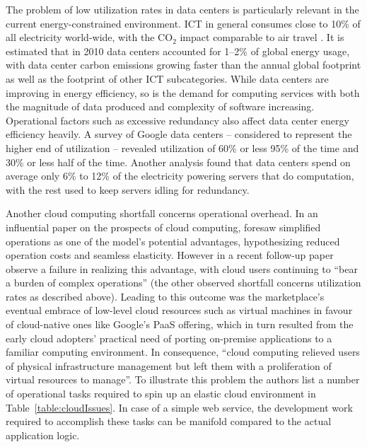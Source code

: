 The problem of low utilization rates in data centers is particularly relevant in the current energy-constrained environment. ICT in general consumes close to 10\% of all electricity world-wide, with the CO$_2$ impact comparable to air travel \parencite{buyya2017manifesto}. It is estimated that in 2010 data centers accounted for 1--2\% of global energy usage, with data center carbon emissions growing faster than the annual global footprint as well as the footprint of other ICT subcategories. While data centers are improving in energy efficiency, so is the demand for computing services with both the magnitude of data produced and complexity of software increasing. Operational factors such as excessive redundancy also affect data center energy efficiency heavily. A survey of Google data centers -- considered to represent the higher end of utilization -- revealed utilization of 60\% or less 95\% of the time and 30\% or less half of the time. Another analysis found that data centers spend on average only 6\% to 12\% of the electricity powering servers that do computation, with the rest used to keep servers idling for redundancy. \parencite{horner16powerusage}

Another cloud computing shortfall concerns operational overhead. In an influential paper on the prospects of cloud computing, \textcite{armbrust09berkeleyView} foresaw simplified operations as one of the model's potential advantages, hypothesizing reduced operation costs and seamless elasticity. However in a recent follow-up paper \textcite{jonas19berkeleyView} observe a failure in realizing this advantage, with cloud users continuing to ``bear a burden of complex operations'' (the other observed shortfall concerns utilization rates as described above). Leading to this outcome was the marketplace's eventual embrace of low-level cloud resources such as virtual machines in favour of cloud-native ones like Google's PaaS offering, which in turn resulted from the early cloud adopters' practical need of porting on-premise applications to a familiar computing environment. In consequence, ``cloud computing relieved users of physical infrastructure management but left them with a proliferation of virtual resources to manage''. To illustrate this problem the authors list a number of operational tasks required to spin up an elastic cloud environment in Table~\ref{table:cloudIssues}. In case of a simple web service, the development work required to accomplish these tasks can be manifold compared to the actual application logic.

